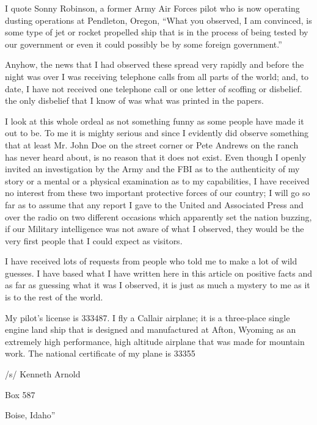 \begin{svgraybox}
      I quote Sonny Robinson, a former Army Air Forces pilot who is now operating dusting operations at Pendleton, Oregon, ``What you observed, I am convinced, is some type of jet or rocket propelled ship that is in the process of being tested by our government or even it could possibly be by some foreign government.''

      Anyhow, the news that I had observed these spread very rapidly and before the night was over I was receiving telephone calls from all parts of the world; and, to date, I have not received one telephone call or one letter of scoffing or disbelief. the only disbelief that I know of was what was printed in the papers.

      I look at this whole ordeal as not something funny as some people have made it out to be. To me it is mighty serious and since I evidently did observe something that at least Mr. John Doe on the street corner or Pete Andrews on the ranch has never heard about, is no reason that it does not exist. Even though I openly invited an investigation by the Army and the
      FBI as to the authenticity of my story or a mental or a physical examination as to my capabilities, I have received no interest from these two important protective forces of our country; I will go so far as to assume that any report I gave to the United and Associated Press and over the radio on two different occasions which apparently set the nation buzzing, if our Military intelligence was not aware of what I observed, they would be the very first people that I could expect as visitors.

      I have received lots of requests from people who told me to make a lot of wild guesses. I have based what I have written here in this article on positive facts and as far as guessing what it was I observed, it is just as much a mystery to me as it is to the rest of the world.

      My pilot's license is 333487. I fly a Callair airplane; it is a three-place single engine land ship that is designed and manufactured at Afton, Wyoming as an extremely high performance, high altitude airplane that was made for mountain work. The national certificate of my plane is 33355


/s/ Kenneth Arnold

Box 587

Boise, Idaho''
\end{svgraybox}

